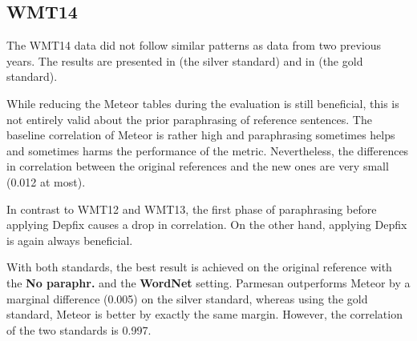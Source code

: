 %


\subsection{WMT14 \label{vysledky}}
The WMT14 data did not follow similar patterns as data from two previous years. 
The results are presented in  (the silver standard) and in 
 (the gold standard).

While reducing the Meteor tables during the evaluation is still beneficial, %
this is not 
entirely valid about the prior paraphrasing of reference sentences. The baseline correlation 
of Meteor is rather high and paraphrasing sometimes helps and sometimes harms the performance 
of the metric. Nevertheless, the differences in correlation between the original references 
and the new ones are very small (0.012 at most).

In contrast to WMT12 and WMT13, the first phase of paraphrasing before applying Depfix causes
a drop in correlation. On the other hand, applying Depfix is again always beneficial.

With both standards, the best result is achieved on the original reference with 
the \textbf{No paraphr.} and the \textbf{WordNet} setting. Parmesan outperforms Meteor 
by a marginal difference (0.005) on the silver standard, whereas using the gold standard, 
Meteor is better by exactly the same margin. However, the correlation of the two standards 
is 0.997.

